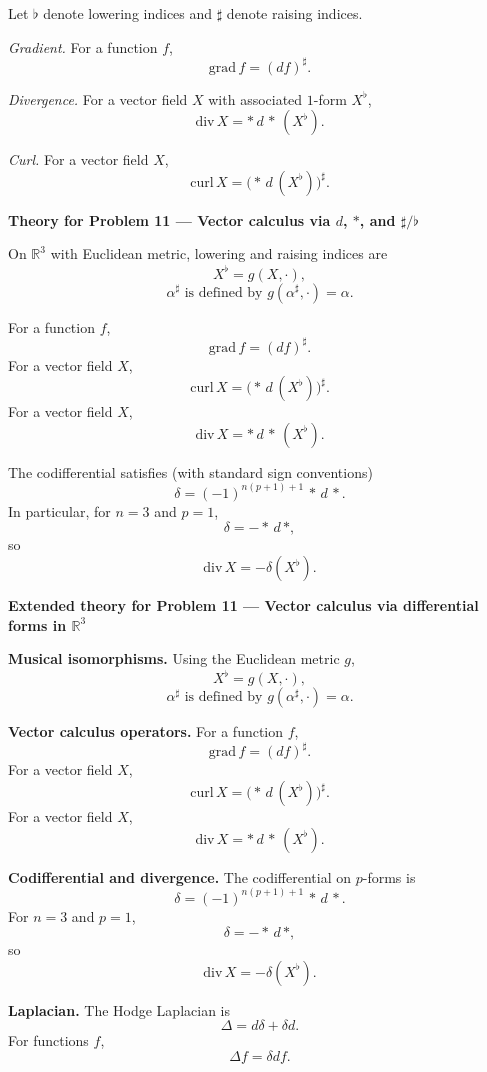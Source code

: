 \begin{solution}
Let $\flat$ denote lowering indices and $\sharp$ denote raising indices.

\textit{Gradient.}
For a function $f$,
\[
\mathrm{grad}\,f=(df)^\sharp.
\]

\textit{Divergence.}
For a vector field $X$ with associated $1$-form $X^\flat$,
\[
\mathrm{div}\,X=*\,d\,*\,(X^\flat).
\]

\textit{Curl.}
For a vector field $X$,
\[
\mathrm{curl}\,X=\bigl(*\,d\,(X^\flat)\bigr)^\sharp.
\]


\par\medskip\noindent\textbf{Theory for Problem 11 --- Vector calculus via $d$, $*$, and $\sharp/\flat$}\par\smallskip


On $\mathbb{R}^3$ with Euclidean metric, lowering and raising indices are
\[
X^\flat=g(X,\cdot),
\]
\[
\alpha^\sharp \text{ is defined by } g(\alpha^\sharp,\cdot)=\alpha.
\]

For a function $f$,
\[
\mathrm{grad}\,f=(df)^\sharp.
\]
For a vector field $X$,
\[
\mathrm{curl}\,X=\bigl(*\,d\,(X^\flat)\bigr)^\sharp.
\]
For a vector field $X$,
\[
\mathrm{div}\,X=*\,d\,*\,(X^\flat).
\]

The codifferential satisfies (with standard sign conventions)
\[
\delta = (-1)^{n(p+1)+1}\,*\,d\,*.
\]
In particular, for $n=3$ and $p=1$,
\[
\delta=-*\,d\,*,
\]
so
\[
\mathrm{div}\,X=-\delta(X^\flat).
\]



\par\medskip\noindent\textbf{Extended theory for Problem 11 --- Vector calculus via differential forms in $\mathbb{R}^3$}\par\smallskip


\textbf{Musical isomorphisms.}
Using the Euclidean metric $g$,
\[
X^\flat=g(X,\cdot),
\]
\[
\alpha^\sharp \text{ is defined by } g(\alpha^\sharp,\cdot)=\alpha.
\]

\textbf{Vector calculus operators.}
For a function $f$,
\[
\mathrm{grad}\,f=(df)^\sharp.
\]
For a vector field $X$,
\[
\mathrm{curl}\,X=\bigl(*\,d\,(X^\flat)\bigr)^\sharp.
\]
For a vector field $X$,
\[
\mathrm{div}\,X=*\,d\,*\,(X^\flat).
\]

\textbf{Codifferential and divergence.}
The codifferential on $p$-forms is
\[
\delta = (-1)^{n(p+1)+1}\,*\,d\,*.
\]
For $n=3$ and $p=1$,
\[
\delta=-*\,d\,*,
\]
so
\[
\mathrm{div}\,X=-\delta(X^\flat).
\]

\textbf{Laplacian.}
The Hodge Laplacian is
\[
\Delta=d\delta+\delta d.
\]
For functions $f$,
\[
\Delta f=\delta df.
\]

\end{solution}

